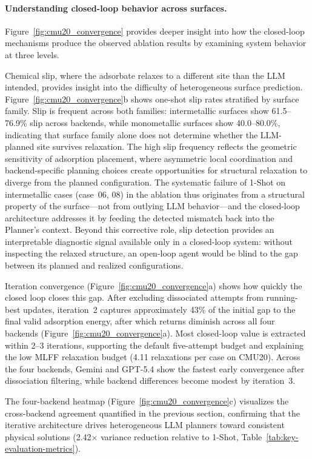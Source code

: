 \paragraph{Understanding closed-loop behavior across surfaces.}
Figure~\ref{fig:cmu20_convergence} provides deeper insight into how the closed-loop mechanisms produce the observed ablation results by examining system behavior at three levels.

Chemical slip, where the adsorbate relaxes to a different site than the LLM intended, provides insight into the difficulty of heterogeneous surface prediction.
Figure~\ref{fig:cmu20_convergence}b shows one-shot slip rates stratified by surface family.
Slip is frequent across both families: intermetallic surfaces show 61.5--76.9\% slip across backends, while monometallic surfaces show 40.0--80.0\%, indicating that surface family alone does not determine whether the LLM-planned site survives relaxation.
The high slip frequency reflects the geometric sensitivity of adsorption placement, where asymmetric local coordination and backend-specific planning choices create opportunities for structural relaxation to diverge from the planned configuration.
The systematic failure of 1-Shot on intermetallic cases (case~06, 08) in the ablation thus originates from a structural property of the surface---not from outlying LLM behavior---and the closed-loop architecture addresses it by feeding the detected mismatch back into the Planner's context.
Beyond this corrective role, slip detection provides an interpretable diagnostic signal available only in a closed-loop system: without inspecting the relaxed structure, an open-loop agent would be blind to the gap between its planned and realized configurations.


Iteration convergence (Figure~\ref{fig:cmu20_convergence}a) shows how quickly the closed loop closes this gap. After excluding dissociated attempts from running-best updates, iteration~2 captures approximately 43\% of the initial gap to the final valid adsorption energy, after which returns diminish across all four backends (Figure~\ref{fig:cmu20_convergence}a). Most closed-loop value is extracted within 2--3 iterations, supporting the default five-attempt budget and explaining the low MLFF relaxation budget (4.11 relaxations per case on CMU20).
Across the four backends, Gemini and GPT-5.4 show the fastest early convergence after dissociation filtering, while backend differences become modest by iteration~3.

The four-backend heatmap (Figure~\ref{fig:cmu20_convergence}c) visualizes the cross-backend agreement quantified in the previous section, confirming that the iterative architecture drives heterogeneous LLM planners toward consistent physical solutions (2.42$\times$ variance reduction relative to 1-Shot, Table~\ref{tab:key-evaluation-metrics}).


